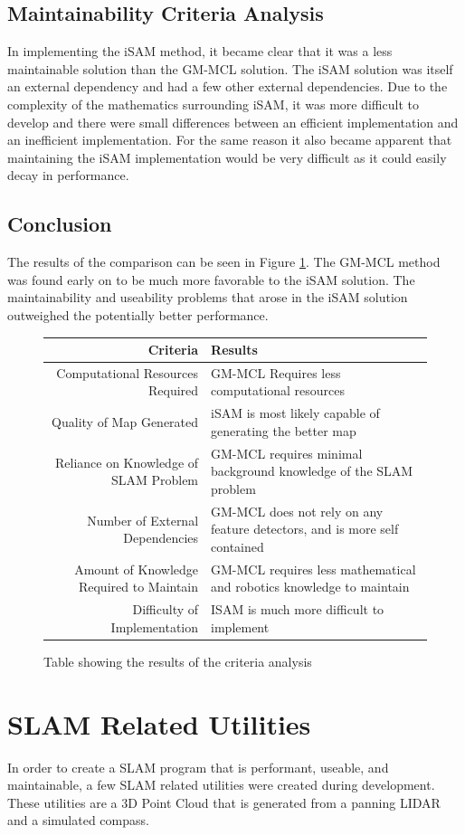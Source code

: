 \documentclass[10pt]{IEEEtran}
\begin{document}
\subsection{Maintainability Criteria Analysis}
In implementing the iSAM method, it became clear that it was a less maintainable solution
than the GM-MCL solution.  The iSAM solution was itself an external dependency and had a few 
other external dependencies.  Due to the complexity of the mathematics surrounding iSAM, it
was more difficult to develop and there were small differences between an efficient
implementation and an inefficient implementation.  For the same reason it also became
apparent that maintaining the iSAM implementation would be very difficult as it could easily
decay in performance.

\subsection{Conclusion}
The results of the comparison can be seen in Figure \ref{fig:CriteriaComp}.  The GM-MCL
method was found early on to be much more favorable to the iSAM solution.  The 
maintainability and useability 
problems that arose in the iSAM solution outweighed the potentially better performance.
\begin{figure}
\begin{tabular} { r | l }
	Criteria & Results \\
	\hline Computational Resources Required & GM-MCL Requires less computational resources\\ 
	Quality of Map Generated &  iSAM is most likely capable of generating the better map\\
	Reliance on Knowledge of SLAM Problem &   GM-MCL requires minimal background knowledge of the SLAM problem\\
	Number of External Dependencies  &  GM-MCL does not rely on any feature detectors, and is more self contained\\
	Amount of Knowledge Required to Maintain &  GM-MCL requires less mathematical and robotics knowledge to maintain\\
	Difficulty of Implementation &  ISAM is much more difficult to implement
\end{tabular}
\caption{Table showing the results of the criteria analysis}
\label{fig:CriteriaComp}
\end{figure}

\section{SLAM Related Utilities}
In order to create a SLAM program that is performant, useable, and maintainable, a few 
SLAM related utilities were created during development.  These utilities are a 3D Point Cloud
that is generated from a panning LIDAR and a simulated compass.
\end{document}
